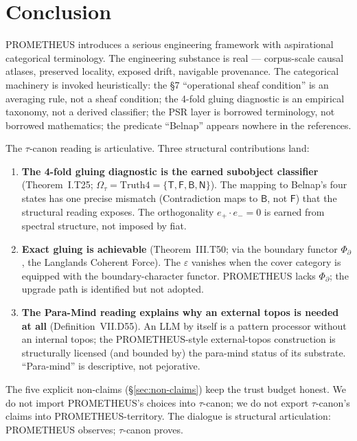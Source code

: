\documentclass{pantarhei-researchnote}
\newcommand{\PsiD}{\ensuremath{\Phi_{\partial}}}
\newcommand{\Truth}{\ensuremath{\mathrm{Truth4}}}
\newcommand{\Omegatau}{\ensuremath{\Omega_{\tau}}}
\begin{document}
\section{Conclusion}
\label{sec:conclusion}

PROMETHEUS \cite{Mahadevan-PROMETHEUS-2026} introduces a serious
engineering framework with aspirational categorical terminology.
The engineering substance is real --- corpus-scale causal atlases,
preserved locality, exposed drift, navigable provenance. The
categorical machinery is invoked heuristically: the §7 ``operational
sheaf condition'' is an averaging rule, not a sheaf condition; the
4-fold gluing diagnostic is an empirical taxonomy, not a derived
classifier; the PSR layer is borrowed terminology, not borrowed
mathematics; the predicate ``Belnap'' appears nowhere in the
references.

The $\tau$-canon reading is articulative. Three structural
contributions land:

\begin{enumerate}
\item \textbf{The 4-fold gluing diagnostic is the earned subobject
classifier} (Theorem~I.T25; $\Omegatau = \Truth = \{\mathsf{T},
\mathsf{F}, \mathsf{B}, \mathsf{N}\}$). The mapping to Belnap's
four states has one precise mismatch (Contradiction maps to
$\mathsf{B}$, not $\mathsf{F}$) that the structural reading
exposes. The orthogonality $e_{+} \cdot e_{-} = 0$ is earned from
spectral structure, not imposed by fiat.

\item \textbf{Exact gluing is achievable} (Theorem~III.T50; via
the boundary functor $\PsiD$, the Langlands Coherent Force). The
$\varepsilon$ vanishes when the cover category is equipped with the
boundary-character functor. PROMETHEUS lacks $\PsiD$; the upgrade
path is identified but not adopted.

\item \textbf{The Para-Mind reading explains why an external topos
is needed at all} (Definition~VII.D55). An LLM by itself is a
pattern processor without an internal topos; the PROMETHEUS-style
external-topos construction is structurally licensed (and bounded
by) the para-mind status of its substrate. ``Para-mind'' is
descriptive, not pejorative.
\end{enumerate}

The five explicit non-claims (\S\ref{sec:non-claims}) keep the
trust budget honest. We do not import PROMETHEUS's choices into
$\tau$-canon; we do not export $\tau$-canon's claims into
PROMETHEUS-territory. The dialogue is structural articulation:
PROMETHEUS observes; $\tau$-canon proves.
\end{document}
